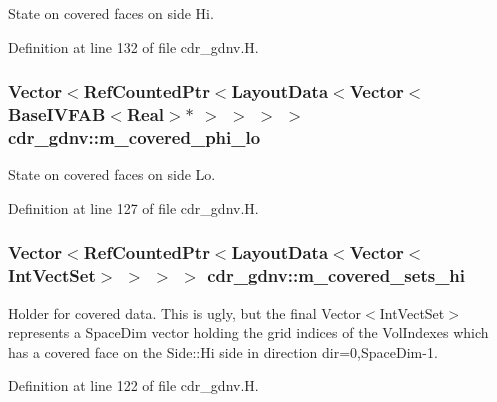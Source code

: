 State on covered faces on side Hi. 



Definition at line 132 of file cdr\+\_\+gdnv.\+H.

\subsubsection[{\texorpdfstring{m\+\_\+covered\+\_\+phi\+\_\+lo}{m_covered_phi_lo}}]{\setlength{\rightskip}{0pt plus 5cm}Vector$<$Ref\+Counted\+Ptr$<$Layout\+Data$<$Vector$<$Base\+I\+V\+F\+AB$<$Real$>$$\ast$ $>$ $>$ $>$ $>$ cdr\+\_\+gdnv\+::m\+\_\+covered\+\_\+phi\+\_\+lo\hspace{0.3cm}{\ttfamily [protected]}}\hypertarget{classcdr__gdnv_ad190c064e236d67f2ba30983f58e7deb}{}\label{classcdr__gdnv_ad190c064e236d67f2ba30983f58e7deb}


State on covered faces on side Lo. 



Definition at line 127 of file cdr\+\_\+gdnv.\+H.

\subsubsection[{\texorpdfstring{m\+\_\+covered\+\_\+sets\+\_\+hi}{m_covered_sets_hi}}]{\setlength{\rightskip}{0pt plus 5cm}Vector$<$Ref\+Counted\+Ptr$<$Layout\+Data$<$Vector$<$Int\+Vect\+Set$>$ $>$ $>$ $>$ cdr\+\_\+gdnv\+::m\+\_\+covered\+\_\+sets\+\_\+hi\hspace{0.3cm}{\ttfamily [protected]}}\hypertarget{classcdr__gdnv_a0b6f89620dc409d80c4decb394854b83}{}\label{classcdr__gdnv_a0b6f89620dc409d80c4decb394854b83}


Holder for covered data. This is ugly, but the final Vector$<$\+Int\+Vect\+Set$>$ represents a Space\+Dim vector holding the grid indices of the Vol\+Indexes which has a covered face on the Side\+::\+Hi side in direction dir=0,Space\+Dim-\/1. 



Definition at line 122 of file cdr\+\_\+gdnv.\+H.

